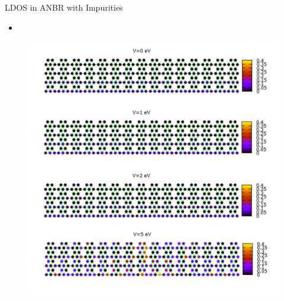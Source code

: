 \documentclass[handout,t]{beamer}
\begin{document}
\begin{frame}{LDOS in ANBR with Impurities}
	\begin{itemize}
		\item 
	\end{itemize}
	\begin{figure}[!ht]
		\centering
		\includegraphics[width=.3\linewidth]{../figures/Slide3.PNG}
		\label{armCSLDOS}
	  \end{figure}
\end{frame}
\end{document}
